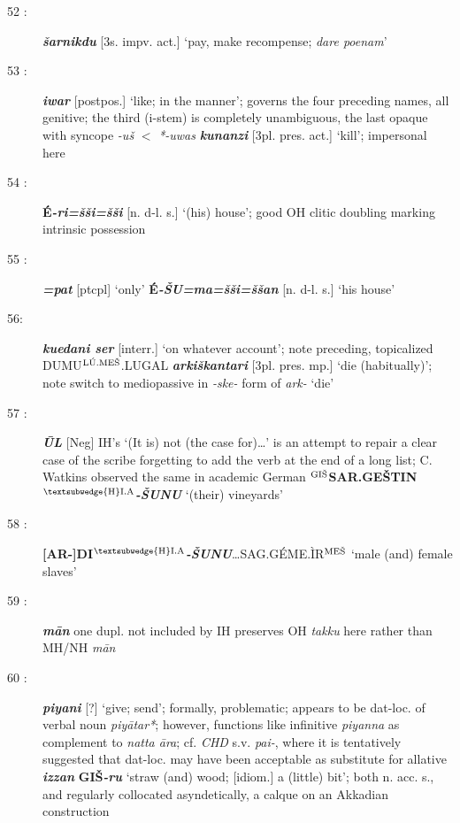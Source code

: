\documentclass[10pt]{article}
\newcommand{\supersc}[1]{$^{\textrm{\scriptsize{#1}}}$}  	%
\newcommand{\bit}[1]{\textbf{\textit{#1}}}				%
\newcommand{\p}[1]{{\tiny[{#1}]}}					%
\newcommand{\hith}{\textsubwedge{h}}
\newcommand{\Hith}{\textsubwedge{H}}
\newcommand{\hpl}{\supersc{{\Hith}I.A}}
\newcommand{\men}{\supersc{L\'U.ME\v{S}}}
\newcommand{\mpl}{\supersc{ME\v{S}}}
\newcommand{\wood}{\supersc{GI\v{S}}}
\renewcommand{\.}[1]{\textsubdot{#1}}
\begin{document}
\begin{description}
\item[52 :] \bit{\v{s}arnikdu} \p{3s. impv. act.} `pay, make recompense; \textit{dare poenam}'

\item[53 :] \bit{iwar} \p{postpos.} `like; in the manner'; governs the four preceding names, all genitive; the third (i-stem) is completely unambiguous, the last opaque with syncope \textit{-u\v{s}} $<$ \textit{*-uwas} \bit{kunanzi} \p{3pl. pres. act.} `kill'; impersonal here

\item[54 :] \textbf{\'E}\bit{-ri=\v{s}\v{s}i=\v{s}\v{s}i} \p{n. d-l. s.} `(his) house'; good OH clitic doubling marking intrinsic possession

\item[55 :] \bit{=pat} \p{ptcpl} `only' \textbf{\'E}\bit{-\v{S}U=ma=\v{s}\v{s}i=\v{s}\v{s}an} \p{n. d-l. s.} `his house'

\item[56: ] \bit{kuedani ser} \p{interr.} `on whatever account'; note preceding, topicalized DUMU\men.LUGAL \bit{{\hith}arki\v{s}kantari} \p{3pl. pres. mp.} `die (habitually)'; note switch to mediopassive in \textit{-ske-} form of \textit{{\hith}ark-} `die'

\item[57 :] \bit{\=UL} \p{\sc Neg} IH's `(It is) not (the case for)\ldots' is an attempt to repair a clear case of the scribe forgetting to add the verb at the end of a long list; C. Watkins observed the same in academic German \textbf{{\wood}SAR.GE\v{S}TIN{\hpl}}\bit{-\v{S}UNU} `(their) vineyards'

\item[58 :] \textbf{[AR-]DI{\hpl}}\bit{-\v{S}UNU}{\ldots}SAG.G\'EME.\`IR{\mpl} `male (and) female slaves'

\item[59 :] \bit{m\=an} one dupl. not included by IH preserves OH \textit{takku} here rather than MH/NH \textit{m\=an}

\item[60 :] 
\bit{piyani} \p{?} `give; send'; formally, problematic; appears to be dat-loc. of verbal noun \textit{piy\=atar*}; however, functions like infinitive \textit{piyanna} as complement to \textit{natta \=ara}; cf. \textit{CHD} s.v. \textit{pai-}, where it is tentatively suggested that dat-loc. may have been acceptable as substitute for allative  \bit{izzan} \textbf{GI\v{S}}\bit{-ru} `straw (and) wood; \p{idiom.} a (little) bit'; both n. acc. s., and regularly collocated asyndetically, a calque on an Akkadian construction


\end{description}
\end{document}
